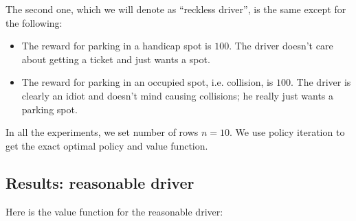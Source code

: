 \documentclass[paper=a4, fontsize=11pt]{scrartcl}
\begin{document}
The second one, which we will denote as ``reckless driver'', is the same except for the following:

\begin{itemize}
\item The reward for parking in a handicap spot is $100$. The driver doesn't care about getting a ticket and just wants a spot.
\item The reward for parking in an occupied spot, i.e. collision, is $100$. The driver is clearly an idiot and doesn't mind causing collisions; he really just wants a parking spot.
\end{itemize}

In all the experiments, we set number of rows $n=10$. We use policy iteration to get the exact optimal policy and value function.

\subsection{Results: reasonable driver}

Here is the value function for the reasonable driver:
\end{document}
